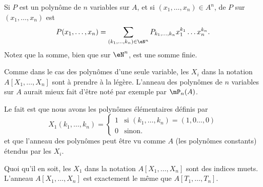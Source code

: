 \begin{definition}
    Si \( P\) est un polynôme de \( n\) variables sur \( A\), et si \( (x_1,\ldots, x_n)\in A^n\),  de \( P\) sur \( (x_1,\ldots, x_n)\) est
    \begin{equation}
        P(x_1,\ldots, x_n)=\sum_{(k_1,\ldots, k_n)\in \eN^n}P_{k_1,\ldots, k_n}x_1^{k_1}\ldots x_n^{k_n}.
    \end{equation}
    Notez que la somme, bien que sur \( \eN^n\), est une somme finie.
\end{definition}

\begin{normaltext}
    Comme dans le cas des polynômes d'une seule variable, les \( X_i\) dans la notation \( A[X_1,\ldots, X_n]\) sont à prendre à la légère. L'anneau des polynômes de \( n\) variables sur \( A\) aurait mieux fait d'être noté par exemple par \( \mP_n(A)\).

    Le fait est que nous avons les polynômes élémentaires définis par
    \begin{equation}
        X_1(k_1,\ldots, k_n)=\begin{cases}
            1    &   \text{si } (k_1,\ldots, k_n)=(1,0\ldots, 0)\\
            0    &    \text{sinon. }
        \end{cases}
    \end{equation}
    et que l'anneau des polynômes peut être vu comme \( A\) (les polynômes constants) étendus par les \( X_i\).

    Quoi qu'il en soit, les \( X_1\) dans la notation \( A[X_1,\ldots, X_n]\) sont des indices muets. L'anneau \( A[X_1,\ldots, X_n]\) est exactement le même que \( A[T_1,\ldots, T_n]\).
\end{normaltext}




